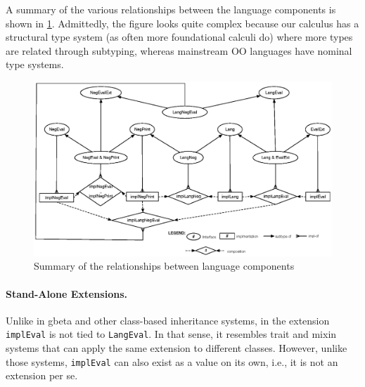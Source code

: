 A summary of the various relationships between the language components is shown
in \cref{fig:diagram}. Admittedly, the figure looks quite complex because our
calculus has a structural type system (as often more foundational calculi
do) where more types are related through subtyping, whereas mainstream OO
languages have nominal type systems.



\begin{figure}[t]
  \centering
\includegraphics[scale=0.75]{figures/diagram.eps}
\caption{Summary of the relationships between language components}
\label{fig:diagram}
\end{figure}


\paragraph{Stand-Alone Extensions.}
Unlike in \textsf{gbeta} and other class-based inheritance systems, in \namee
the extension \lstinline{implEval} is not tied to \lstinline{LangEval}. In that
sense, it resembles trait and mixin systems that can apply the same extension
to different classes. However, unlike those systems, \lstinline{implEval} can also
exist as a value on its own, i.e., it is not an extension per se.



